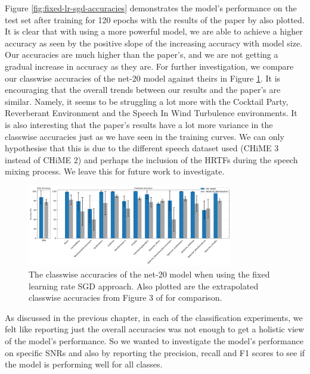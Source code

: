 \documentclass[logo,bsc,singlespacing,parskip,online]{infthesis}
\begin{document}
Figure \ref{fig:fixed-lr-sgd-accuracies} demonstrates the model's performance on the test set after training for 120 epochs 
with the results of the paper by \citet{Huwel2020HearDS} also plotted. It is clear 
that with using a more powerful model, we are able to achieve a higher accuracy 
as seen by the positive slope of the increasing accuracy with model size.
Our accuracies are much higher than the paper's, and we are not getting a gradual 
increase in accuracy as they are. For further investigation, we 
compare our classwise accuracies of the net-20 model against theirs in Figure 
\ref{fig:fixed-lr-sgd-classwise-accuracies}. It is encouraging 
that the overall trends between our results and the paper's are similar. 
Namely, it seems to be struggling a lot more with the Cocktail Party, Reverberant 
Environment and the Speech In Wind Turbulence environments.
It is also interesting that the paper's results have a lot more variance in the classwise accuracies 
just as we have seen in the training curves. We can only hypothesise 
that this is due to the different speech dataset used (CHiME 3 instead of CHiME 2) 
and perhaps the inclusion of the HRTFs during the speech mixing process. We leave 
this for future work to investigate.

\begin{figure}[h]
   \centering
   \includegraphics[width=0.8\textwidth]{net-20/FIXED-fixed-lr-sgd/classwise_accuracies.png}
   \caption{The classwise accuracies of the net-20 model when using the fixed learning rate SGD approach.
   Also plotted are the extrapolated classwise accuracies from Figure 3 of \citet{Huwel2020HearDS} for comparison.}
   \label{fig:fixed-lr-sgd-classwise-accuracies}
\end{figure}   

As discussed in the previous chapter, in each of the classification experiments, we felt like reporting just the overall 
accuracies was not enough to get a holistic view of the model's performance. 
So we wanted to investigate the model's performance on specific SNRs and also by reporting the precision, recall and F1 scores to
see if the model is performing well for all classes. 
\end{document}
